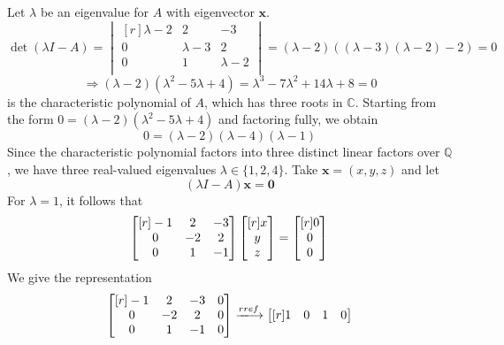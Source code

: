 \documentclass{article}
\theoremstyle{definition}
\newenvironment{solution}[1][]{\begin{replacementsoln}}{\end{replacementsoln}}
\begin{document}
\begin{solution}
  Let \(\lambda \) be an eigenvalue for \(A\) with eigenvector \(\mathbf{x}\).
  \[
    \det \left( \lambda I - A \right) = \begin{vmatrix}[r]
      \lambda -2 &2  &-3   \\
       0&\lambda -3  &2   \\
       0&1  &\lambda -2   \\
    \end{vmatrix} = (\lambda -2)((\lambda -3)(\lambda -2)-2)=0
  \]
  \[
    \Longrightarrow (\lambda -2)\left( \lambda ^2 - 5\lambda +4\right) = \lambda ^3-7\lambda ^2+14\lambda+8=0
  \]
  is the characteristic polynomial of \(A\), which has three roots in \(\mathbb{C}\). Starting from the form \(0=(\lambda -2)\left( \lambda ^2 - 5\lambda +4\right)\) and factoring fully, we obtain
  \[
    0=(\lambda -2)(\lambda -4)(\lambda -1)
  \]
  Since the characteristic polynomial factors into three distinct linear factors over \(\mathbb{Q}\), we have three real-valued eigenvalues \(\lambda \in \{ 1,2,4 \} \). Take \(\mathbf{x}=(x,y,z)\) and let
  \[
    (\lambda I-A)\mathbf{x}=\mathbf{0}
  \]
  For \(\lambda =1\), it follows that
  \[
    \begin{bmatrix}[r]
      -1 &2  &-3   \\
       0&-2  &2   \\
       0&1  &-1   \\
    \end{bmatrix} \begin{bmatrix}[r]
       x \\
       y \\
       z \\
    \end{bmatrix} = \begin{bmatrix}[r]
       0 \\
       0 \\
       0 \\
    \end{bmatrix}\\
  \]
  We give the representation
  \[
    \begin{bmatrix}[r]
      -1 &2  &-3  &0   \\
       0&-2  &2  &0   \\
       0&1  &-1  &0   \\
    \end{bmatrix}\xlongrightarrow{rref} \begin{bmatrix}[r]
      1 &0  &1  &0   \\

\end{bmatrix}\]
\end{solution}
\end{document}
